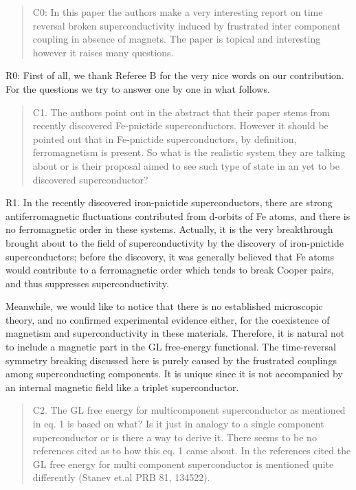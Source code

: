 \documentclass[11pt]{article}
\begin{document}
\begin{quote}
C0: In this paper the authors make a very interesting report on time
reversal broken superconductivity induced by frustrated inter component
coupling in absence of magnets. The paper is topical and interesting
however it raises many questions.
\end{quote}

R0: First of all, we thank Referee B for the very nice words on our
contribution. For the questions we try to answer one by one in what
follows.

\begin{quote}
C1. The authors point out in the abstract that their paper stems from
recently discovered Fe-pnictide superconductors. However it should be
pointed out that in Fe-pnictide superconductors, by definition,
ferromagnetism is present. So what is the realistic system they are
talking about or is their proposal aimed to see such type of state in an
yet to be discovered superconductor?
\end{quote}

R1. In the recently discovered iron-pnictide superconductors, there are
strong antiferromagnetic fluctuations contributed from d-orbits of Fe
atoms, and there is no ferromagnetic order in these systems. Actually,
it is the very breakthrough brought about to the field of
superconductivity by the discovery of iron-pnictide superconductors;
before the discovery, it was generally believed that Fe atoms would
contribute to a ferromagnetic order which tends to break Cooper pairs,
and thus suppresses superconductivity.

Meanwhile, we would like to notice that there is no established
microscopic theory, and no confirmed experimental evidence either, for
the coexistence of magnetism and superconductivity in these materials.
Therefore, it is natural not to include a magnetic part in the GL
free-energy functional. The time-reversal symmetry breaking discussed
here is purely caused by the frustrated couplings among superconducting
components. It is unique since it is not accompanied by an internal
magnetic field like a triplet superconductor.

\begin{quote}
C2. The GL free energy for multicomponent superconductor as mentioned in
eq. 1 is based on what? Is it just in analogy to a single component
superconductor or is there a way to derive it. There seems to be no
references cited as to how this eq. 1 came about. In the references
cited the GL free energy for multi component superconductor is mentioned
quite differently (Stanev et.al PRB 81, 134522).
\end{quote}
\end{document}
